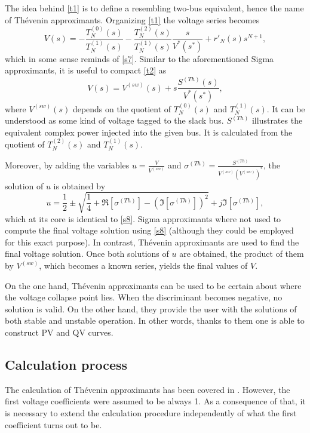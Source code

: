 \documentclass[conference]{IEEEtran}
\begin{document}
The idea behind \eqref{t1} is to define a resembling two-bus equivalent, hence the name of Thévenin approximants. Organizing \eqref{t1} the voltage series becomes
\begin{equation}
  V(s)=-\frac{T^{(0)}_N(s)}{T^{(1)}_N(s)}-\frac{T^{(2)}_N(s)}{T^{(1)}_N(s)}\frac{s}{V^*(s^*)}+r'_N(s)s^{N+1},
  \label{t2}
\end{equation}
which in some sense reminds of \eqref{s7}. Similar to the aforementioned Sigma approximants, it is useful to compact \eqref{t2} as
\begin{equation}
  V(s)=V^{(sw)}(s)+s\frac{S^{(Th)}(s)}{V^*(s^*)},
  \label{t3}
\end{equation}
where $V^{(sw)}(s)$ depends on the quotient of $T^{(0)}_N(s)$ and $T^{(1)}_N(s)$. It can be understood as some kind of voltage tagged to the slack bus. $S^{(Th)}$ illustrates the equivalent complex power injected into the given bus. It is calculated from the quotient of $T^{(2)}_N(s)$ and $T^{(1)}_N(s)$. 

Moreover, by adding the variables $u=\frac{V}{V^{(sw)}}$ and $\sigma^{(Th)}=\frac{S^{(Th)}}{V^{(sw)}(V^{(sw)})^*}$, the solution of $u$ is obtained by
\begin{equation}
  u=\frac{1}{2}\pm \sqrt{\frac{1}{4} + \Re[\sigma^{(Th)}]-(\Im[\sigma^{(Th)}])^2}+j\Im[\sigma^{(Th)}],
  \label{t4}
\end{equation}
which at its core is identical to \eqref{s8}. Sigma approximants where not used to compute the final voltage solution using \eqref{s8} (although they could be employed for this exact purpose). In contrast, Thévenin approximants are used to find the final voltage solution. Once both solutions of $u$ are obtained, the product of them by $V^{(sw)}$, which becomes a known series, yields the final values of $V$. 

On the one hand, Thévenin approximants can be used to be certain about where the voltage collapse point lies. When the discriminant becomes negative, no solution is valid. On the other hand, they provide the user with the solutions of both stable and unstable operation. In other words, thanks to them one is able to construct PV and QV curves.
\subsection{Calculation process}
The calculation of Thévenin approximants has been covered in \cite{Trias2018}. However, the first voltage coefficients were assumed to be always 1. As a consequence of that, it is necessary to extend the calculation procedure independently of what the first coefficient turns out to be.
\end{document}
